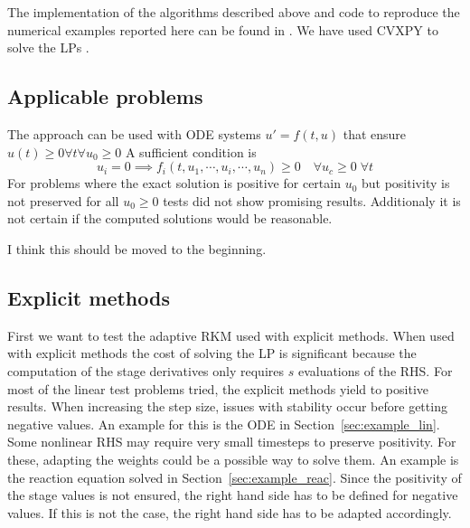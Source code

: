 \documentclass[a4paper]{article}
\numberwithin{equation}{section}
\theoremstyle{plain}
\theoremstyle{definition}
\numberwithin{theorem}{section}
\newcommand{\1}{\mathbbm{1}}
\newcommand{\todo}[1]{{\Large{\color{red}{#1}}}}
\begin{document}
The implementation of the algorithms described above and code to
reproduce the numerical examples reported here can be found in
\cite{repository}. \todo{TODO: New reopsitory with DOI} %
We have used CVXPY to solve the LPs \cite{cvxpy, cvxpy_rewriting}.
\todo{TODO: Which solver of CVXPY?} %


\subsection{Applicable problems}\label{sec:app_problem}
The approach can be used with ODE systems $u' = f(t,u)$ that ensure  $u(t) \geq 0 \forall t \forall {  u_0 \geq 0}$ 
A sufficient condition is  
\begin{equation}
u_i=0 \implies f_i(t,u_1,\cdots,u_i,\cdots,u_n) \geq 0 \quad \forall {u_c \geq 0}\; \forall {t}
\end{equation}
For problems where the exact solution is positive for certain $u_0$ but positivity is not preserved for all $u_0 \geq 0$ tests did not show promising results. Additionaly it is not certain if the computed solutions would be reasonable.

\todo{Note (HR)} I think this should be moved to the beginning.


\subsection{Explicit methods}\label{sec:Ex_expl}
First we want to test the adaptive RKM used with explicit methods.  
When used with explicit methods the cost of solving the LP is significant because the computation of the stage derivatives only requires $s$ evaluations of the RHS.
For most of the linear test problems tried, the explicit methods yield to positive results.  
When increasing the step size, issues with stability occur before getting negative values.  
An example for this is the ODE in Section~\ref{sec:example_lin}.
Some nonlinear RHS may require very small timesteps to preserve positivity.  
For these, adapting the weights could be a possible way to solve them. 
An example is the reaction equation solved in Section~\ref{sec:example_reac}.
Since the positivity of the stage values is not ensured, the right hand side has to be defined for negative values. If this is not the case, the right hand side has to be adapted accordingly.
\end{document}
